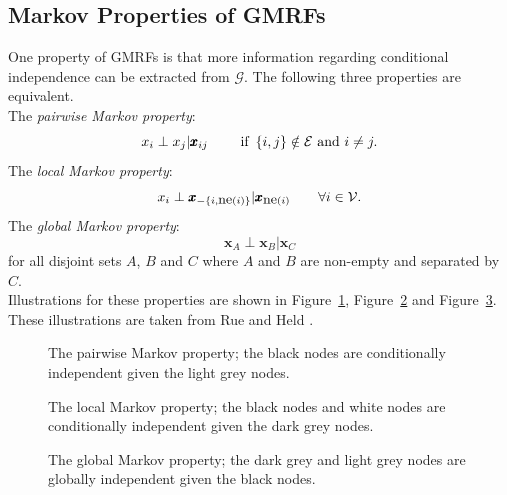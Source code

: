 \subsection{Markov Properties of GMRFs}
One property of GMRFs is that more information regarding conditional independence can be extracted from $\mathcal{G}$. The following three properties are equivalent. \\
The \textit{pairwise Markov property}:
\begin{equation*}
    x_i\perp x_j|\pmb{x}_{ij}\hspace{20pt}\hbox{ if }\left\lbrace i,j\right\rbrace\notin\mathcal{E}\hbox{ and }i\neq j.
\end{equation*}
The \textit{local Markov property}:
\begin{equation*}
    x_i\perp \pmb{x}_{-\left\lbrace i, \hbox{ne}\left(i\right)\right\rbrace}|\pmb{x}_{\hbox{ne}\left(i\right)}\hspace{20pt}\forall i\in\mathcal{V}.
\end{equation*}
The \textit{global Markov property}:
\begin{equation*}
    \pmb{x}_{A}\perp \pmb{x}_{B}|\pmb{x}_{C}
\end{equation*}
for all disjoint sets $A$, $B$ and $C$ where $A$ and $B$ are non-empty and separated by $C$. \\ \clearpage Illustrations for these properties are shown in Figure~\ref{fig:pairwise}, Figure~\ref{fig:local} and Figure~\ref{fig:global}. These illustrations are taken from Rue and Held \autocite[][23--24]{rue2005gaussian}.
\begin{figure}[H]
    \centering
    \caption{The pairwise Markov property; the black nodes are conditionally independent given the light grey nodes.}
    \label{fig:pairwise}
\end{figure}
\begin{figure}[H]
    \centering
    \caption{The local Markov property; the black nodes and white nodes are conditionally independent given the dark grey nodes.}
    \label{fig:local}
\end{figure}
\begin{figure}[H]
    \centering
    \caption{The global Markov property; the dark grey and light grey nodes are globally independent given the black nodes.}
    \label{fig:global}
\end{figure}
